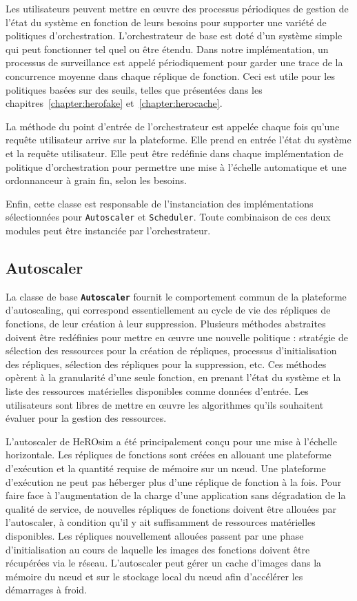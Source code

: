 Les utilisateurs peuvent mettre en œuvre des processus périodiques de gestion de l'état du système en fonction de leurs besoins pour supporter une variété de politiques d'orchestration. L'orchestrateur de base est doté d'un système simple qui peut fonctionner tel quel ou être étendu. Dans notre implémentation, un processus de surveillance est appelé périodiquement pour garder une trace de la concurrence moyenne dans chaque réplique de fonction. Ceci est utile pour les politiques basées sur des seuils, telles que présentées dans les chapitres~\ref{chapter:herofake} et~\ref{chapter:herocache}.

La méthode du point d'entrée de l'orchestrateur est appelée chaque fois qu'une requête utilisateur arrive sur la plateforme. Elle prend en entrée l'état du système et la requête utilisateur. Elle peut être redéfinie dans chaque implémentation de politique d'orchestration pour permettre une mise à l'échelle automatique et une ordonnanceur à grain fin, selon les besoins.

Enfin, cette classe est responsable de l'instanciation des implémentations sélectionnées pour \texttt{Autoscaler} et \texttt{Scheduler}. Toute combinaison de ces deux modules peut être instanciée par l'orchestrateur.

\subsection{Autoscaler}

La classe de base \textbf{\texttt{Autoscaler}} fournit le comportement commun de la plateforme d'autoscaling, qui correspond essentiellement au cycle de vie des répliques de fonctions, de leur création à leur suppression. Plusieurs méthodes abstraites doivent être redéfinies pour mettre en œuvre une nouvelle politique : stratégie de sélection des ressources pour la création de répliques, processus d'initialisation des répliques, sélection des répliques pour la suppression, etc. Ces méthodes opèrent à la granularité d'une seule fonction, en prenant l'état du système et la liste des ressources matérielles disponibles comme données d'entrée. Les utilisateurs sont libres de mettre en œuvre les algorithmes qu'ils souhaitent évaluer pour la gestion des ressources.

L'autoscaler de HeROsim a été principalement conçu pour une mise à l'échelle horizontale. Les répliques de fonctions sont créées en allouant une plateforme d'exécution et la quantité requise de mémoire sur un nœud. Une plateforme d'exécution ne peut pas héberger plus d'une réplique de fonction à la fois. Pour faire face à l'augmentation de la charge d'une application sans dégradation de la qualité de service, de nouvelles répliques de fonctions doivent être allouées par l'autoscaler, à condition qu'il y ait suffisamment de ressources matérielles disponibles. Les répliques nouvellement allouées passent par une phase d'initialisation au cours de laquelle les images des fonctions doivent être récupérées via le réseau. L'autoscaler peut gérer un cache d'images dans la mémoire du nœud et sur le stockage local du nœud afin d'accélérer les démarrages à froid.


